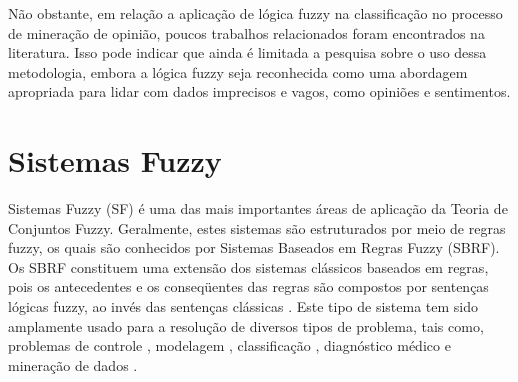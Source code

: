 \documentclass[template.tex]{subfiles}
\begin{document}


Não obstante, em relação a aplicação de lógica fuzzy na classificação no processo de mineração de opinião, poucos trabalhos relacionados foram encontrados na literatura. Isso pode indicar que ainda é limitada a pesquisa sobre o uso dessa metodologia, embora a lógica fuzzy seja reconhecida como uma abordagem apropriada para lidar com dados imprecisos e vagos, como opiniões e sentimentos. 


\section{Sistemas Fuzzy}

Sistemas Fuzzy (SF) é uma das mais importantes áreas de aplicação da Teoria de Conjuntos Fuzzy. Geralmente, estes sistemas são estruturados por meio de regras fuzzy, os quais são conhecidos por Sistemas Baseados em Regras Fuzzy (SBRF). Os SBRF constituem uma extensão dos sistemas clássicos baseados em regras, pois os antecedentes e os conseqüentes das regras são compostos por sentenças lógicas fuzzy, ao invés das sentenças clássicas \cite{herrera2008genetic}. Este tipo de sistema tem sido amplamente usado para a resolução de diversos tipos de problema, tais como, problemas de controle \cite{mamdani1974application, mamdani1975experiment}, modelagem \cite{pedrycz1996fuzzy}, classificação \cite{ishibuchi1994construction, ishibuchi1995selecting}, diagnóstico médico \cite{sivasankar2010knowledge} e mineração de dados \cite{ishibuchi2005classification}.
\end{document}
